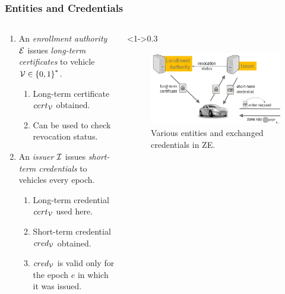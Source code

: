 \documentclass{beamer}
\begin{document}
    \begin{frame}
        \frametitle{Entities and Credentials}
        \begin{columns}
            \begin{column}{0.7\textwidth}
                \begin{enumerate}
                    \item An \emph{enrollment authority} \(\mathcal E\) issues
                    \emph{long-term certificates} to vehicle \(\mathcal V \in
                    \left\{0,1\right\}^*\).
                    \begin{enumerate}
                        \item Long-term certificate \(cert_{\mathcal V}\)
                        obtained.
                        \item Can be used to check revocation status.
                    \end{enumerate}
                    \item<2-> An \emph{issuer} \(\mathcal I\) issues
                    \emph{short-term credentials} to vehicles every epoch.
                    \begin{enumerate}
                        \item Long-term credential \(cert_{\mathcal V}\) used
                        here.
                        \item Short-term credential \(cred_{\mathcal V}\)
                        obtained.
                        \item \(cred_{\mathcal V}\) is valid only for the epoch
                        \(e\) in which it was issued.
                    \end{enumerate}
                \end{enumerate}
            \end{column}
            \begin{column}<1->{0.3\textwidth}
                \begin{figure}
                    \centering
                    \includegraphics[width=\columnwidth]{figs/ze_entities.png}
                    \caption{Various entities and exchanged credentials in ZE.}
                \end{figure}
            \end{column}
        \end{columns}
    \end{frame}
\end{document}
